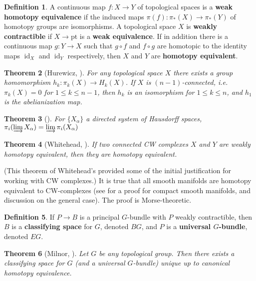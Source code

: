 \documentclass{report}
\theoremstyle{plain}
\newtheorem{theorem}{Theorem}[section]
\theoremstyle{definition}
\newtheorem{definition}[theorem]{Definition}
\theoremstyle{remark}
\DeclareMathOperator{\id}{id}
\newcommand{\pt}{\mathrm{pt}}
\begin{document}
\begin{definition}
  A continuous map $f\colon X \to Y$ of topological spaces is a {\bf
    weak homotopy equivalence} if the induced maps $\pi(f)\colon
  \pi_*(X) \to \pi_*(Y)$ of homotopy groups are isomorphisms. A
  topological space $X$ is {\bf weakly contractible} if $X \to \pt$ is
  a {\bf weak equivalence}. If in addition there is a continuous map
  $g\colon Y \to X$ such that $g \circ f$ and $f \circ g$ are
  homotopic to the identity maps $\id_X$ and $\id_Y$ respectively,
  then $X$ and $Y$ are {\bf homotopy equivalent}.
\end{definition}

\begin{theorem}[Hurewicz, {\cite[Section 20.1]{Dieck2008}}]
  For any topological space $X$ there exists a group homomorphism
  $h_k\colon \pi_k(X) \to H_k(X)$. If $X$ is $(n-1)$-connected, i.e.
  $\pi_k(X) = 0$ for $1 \le k \le n-1$, then $h_k$ is an isomorphism
  for $1 \le k \le n$, and $h_1$ is the abelianization map.
\end{theorem}

\begin{theorem}[{\cite[Section 10.8]{Dieck2008}}] \label{thm:homotopy-injlim}
  For $\{X_\alpha\}$ a directed system of Hausdorff
  spaces, $\pi_i (\varinjlim X_\alpha) = \varinjlim \pi_i(X_\alpha)$
\end{theorem}

\begin{theorem}[Whitehead, {\cite[Theorem 20.1.5]{Dieck2008}}]
  If two connected CW complexes $X$ and $Y$ are weakly homotopy
  equivalent, then they are homotopy equivalent.
\end{theorem}

(This theorem of Whitehead's provided some of the initial
justification for working with CW complexes.) It is true that all
smooth manifolds are homotopy equivalent to CW-complexes (see
\cite[page 220]{Bott1982} for a proof for compact smooth manifolds,
and discussion on the general case). The proof is Morse-theoretic.

\begin{definition}
  If $P \to B$ is a principal $G$-bundle with $P$ weakly contractible,
  then $B$ is a {\bf classifying space} for $G$, denoted $BG$, and $P$
  is a {\bf universal $G$-bundle}, denoted $EG$.
\end{definition}

\begin{theorem}[Milnor, {\cite[Section 14.4]{Dieck2008}}] \label{thm:classifying-space}
  Let $G$ be any topological group. Then there exists a classifying
  space for $G$ (and a universal $G$-bundle) unique up to canonical
  homotopy equivalence.
\end{theorem}
\end{document}
